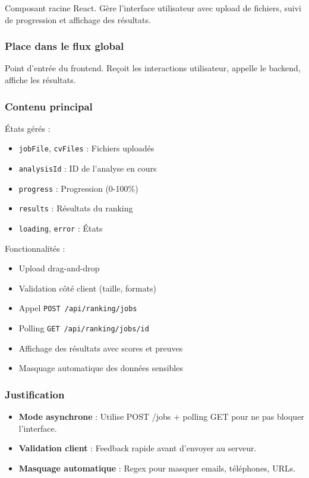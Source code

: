 \documentclass[12pt,a4paper,oneside]{book}
\begin{document}
Composant racine React. Gère l'interface utilisateur avec upload de fichiers, suivi de progression et affichage des résultats.

\subsubsection{Place dans le flux global}

Point d'entrée du frontend. Reçoit les interactions utilisateur, appelle le backend, affiche les résultats.

\subsubsection{Contenu principal}

États gérés :
\begin{itemize}
    \item \texttt{jobFile}, \texttt{cvFiles} : Fichiers uploadés
    \item \texttt{analysisId} : ID de l'analyse en cours
    \item \texttt{progress} : Progression (0-100\%)
    \item \texttt{results} : Résultats du ranking
    \item \texttt{loading}, \texttt{error} : États
\end{itemize}

Fonctionnalités :
\begin{itemize}
    \item Upload drag-and-drop
    \item Validation côté client (taille, formats)
    \item Appel \texttt{POST /api/ranking/jobs}
    \item Polling \texttt{GET /api/ranking/jobs/{id}}
    \item Affichage des résultats avec scores et preuves
    \item Masquage automatique des données sensibles
\end{itemize}

\subsubsection{Justification}

\begin{itemize}
    \item \textbf{Mode asynchrone} : Utilise POST /jobs + polling GET pour ne pas bloquer l'interface.
    
    \item \textbf{Validation client} : Feedback rapide avant d'envoyer au serveur.
    
    \item \textbf{Masquage automatique} : Regex pour masquer emails, téléphones, URLs.
\end{itemize}
\end{document}

